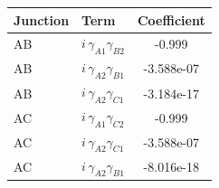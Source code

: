 \begin{tabular}{llc}
\hline
Junction & Term & Coefficient \\
\hline
AB & $i\,\gamma_{A1}\gamma_{B2}$ & -0.999 \\
AB & $i\,\gamma_{A2}\gamma_{B1}$ & -3.588e-07 \\
AB & $i\,\gamma_{A2}\gamma_{C1}$ & -3.184e-17 \\
\hline
AC & $i\,\gamma_{A1}\gamma_{C2}$ & -0.999 \\
AC & $i\,\gamma_{A2}\gamma_{C1}$ & -3.588e-07 \\
AC & $i\,\gamma_{A2}\gamma_{B1}$ & -8.016e-18 \\
\hline
\end{tabular}
